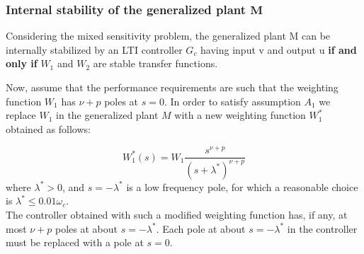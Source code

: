 \documentclass[a4paper,10pt,titlepage]{article}
\numberwithin{equation}{subsection}
\begin{document}
	\subsubsection{Internal stability of the generalized plant $\bm{M}$}
	Considering the mixed sensitivity problem, the generalized plant M can be internally stabilized by an LTI controller $G_c$ having input v and output u \textbf{if and only if} $W_1$ and $W_2$ are stable transfer functions.
	
	\vspace{2pt}
	Now, assume that the performance requirements are such that the weighting function $W_1$ has $\nu+p$ poles at $s=0$. In order to satisfy assumption $A_1$ we replace $W_1$ in the generalized plant $M$ with a new weighting function $W_1^*$ obtained as follows:
	
	\begin{equation}
		W_1^*(s) = W_1 \dfrac{s^{\nu+p}}{(s+\lambda^*)^{\nu+p}}
	\end{equation}
	where $\lambda^* > 0$, and $s=-\lambda^*$ is a low frequency pole, for which a reasonable choice is $\lambda^* \leq 0.01\omega_c$.\\
	The controller obtained with such a modified weighting function has, if any, at most $\nu+p$ poles at about $s=-\lambda^*$. Each pole at about $s=-\lambda^*$ in the controller must be replaced with a pole at $s=0$.
		
\end{document}
